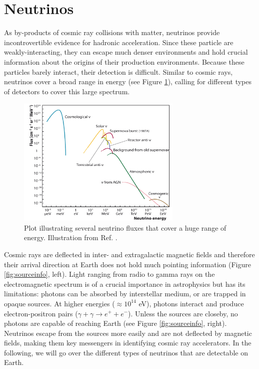 \section{Neutrinos}
\label{sec:neutrinos}
As by-products of cosmic ray collisions with matter, neutrinos provide incontrovertible evidence for hadronic acceleration. Since these particle are weakly-interacting, they can escape much denser environments and hold crucial information about the origins of their production environments. Because these particles barely interact, their detection is difficult. Similar to cosmic rays, neutrinos cover a broad range in energy (see Figure \ref{fig:neutrinospectrumall}), calling for different types of detectors to cover this large spectrum. 

\begin{figure}[t]
\centering
\includegraphics[width=0.7\textwidth]{chapter3/img/neutrinospectrum.png}
\caption{Plot illustrating several neutrino fluxes that cover a huge range of energy. Illustration from Ref. \cite{Katz:2011ke}.}
\label{fig:neutrinospectrumall}
\end{figure}

Cosmic rays are deflected in inter- and extragalactic magnetic fields and therefore their arrival direction at Earth does not hold much pointing information (Figure \ref{fig:sourceinfo}, left). Light ranging from radio to gamma rays on the electromagnetic spectrum is of a crucial importance in astrophysics but has its limitations: photons can be absorbed by interstellar medium, or are trapped in opaque sources. At higher energies ($\approx 10^{14}$ eV), photons interact and produce electron-positron pairs ($\gamma + \gamma \rightarrow e^+ + e^-$). Unless the sources are closeby, no photons are capable of reaching Earth (see Figure \ref{fig:sourceinfo}, right). Neutrinos escape from the sources more easily and are not deflected by magnetic fields, making them key messengers in identifying cosmic ray accelerators. In the following, we will go over the different types of neutrinos that are detectable on Earth.

